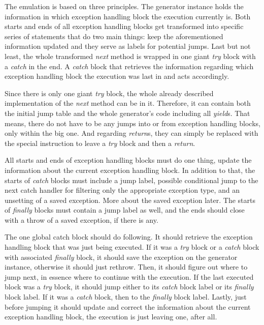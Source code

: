 The emulation is based on three principles. The generator instance holds the information in which exception handling block the execution currently is. Both starts and ends of all exception handling blocks get transformed into specific series of statements that do two main things: keep the aforementioned information updated and they serve as labels for potential jumps. Last but not least, the whole transformed \emph{next} method is wrapped in one giant \emph{try} block with a \emph{catch} in the end. A \emph{catch} block that retrieves the information regarding which exception handling block the execution was last in and acts accordingly. 

Since there is only one giant \emph{try} block, the whole already described implementation of the \emph{next} method can be in it. Therefore, it can contain both the initial jump table and the whole generator’s code including all \emph{yield}s. That means, there do not have to be any jumps into or from exception handling blocks, only within the big one. And regarding \emph{return}s, they can simply be replaced with the special instruction to leave a \emph{try} block and then a \emph{return}.

All starts and ends of exception handling blocks must do one thing, update the information about the current exception handling block. In addition to that, the starts of \emph{catch} blocks must include a jump label, possible conditional jump to the next catch handler for filtering only the appropriate exception type, and an unsetting of a saved exception. More about the saved exception later. The starts of \emph{finally} blocks must contain a jump label as well, and the ends should close with a throw of a saved exception, if there is any.

The one global catch block should do following. It should retrieve the exception handling block that was just being executed. If it was a \emph{try} block or a \emph{catch} block with associated \emph{finally} block, it should save the exception on the generator instance, otherwise it should just rethrow. Then, it should figure out where to jump next, in essence where to continue with the execution. If the last executed block was a \emph{try} block, it should jump either to its \emph{catch} block label or its \emph{finally} block label. If it was a \emph{catch} block, then to the \emph{finally} block label. Lastly, just before jumping it should update and correct the information about the current exception handling block, the execution is just leaving one, after all.


